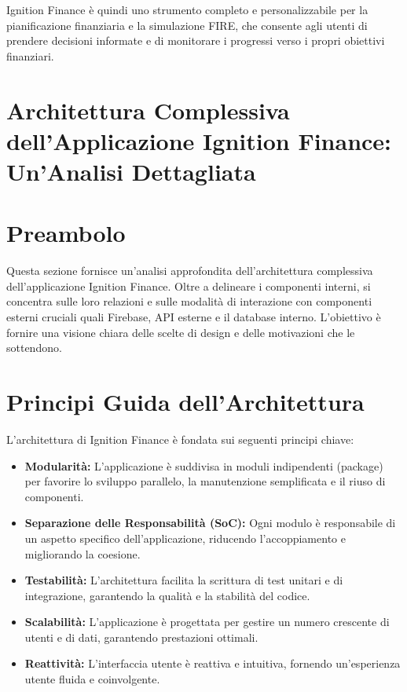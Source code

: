 \documentclass{article}
\begin{document}
Ignition Finance è quindi uno strumento completo e personalizzabile per la
pianificazione finanziaria e la simulazione FIRE, che consente agli utenti di
prendere decisioni informate e di monitorare i progressi verso i propri
obiettivi finanziari.
\section*{Architettura Complessiva dell'Applicazione Ignition Finance: Un'Analisi Dettagliata}
\section{Preambolo}\label{sec:preambolo}

Questa sezione fornisce un'analisi approfondita dell'architettura complessiva
dell'applicazione Ignition Finance.
Oltre a delineare i componenti interni, si
concentra sulle loro relazioni e sulle modalità di interazione con componenti
esterni cruciali quali Firebase, API esterne e il database interno.
L'obiettivo
è fornire una visione chiara delle scelte di design e delle motivazioni che le
sottendono.

\section{Principi Guida
dell'Architettura}\label{sec:principi-guida-dell'architettura}

L'architettura di Ignition Finance è fondata sui seguenti principi chiave:

\begin{itemize}
    \item \textbf{Modularità:} L'applicazione è suddivisa in moduli indipendenti
    (package) per favorire lo sviluppo parallelo, la manutenzione semplificata e
    il riuso di componenti.
    \item \textbf{Separazione delle Responsabilità (SoC):} Ogni modulo è
    responsabile di un aspetto specifico dell'applicazione, riducendo
    l'accoppiamento e migliorando la coesione.
    \item \textbf{Testabilità:} L'architettura facilita la scrittura di test
    unitari e di integrazione, garantendo la qualità e la stabilità del codice.
    \item \textbf{Scalabilità:} L'applicazione è progettata per gestire un
    numero crescente di utenti e di dati, garantendo prestazioni ottimali.
    \item \textbf{Reattività:} L'interfaccia utente è reattiva e intuitiva,
    fornendo un'esperienza utente fluida e coinvolgente.
\end{itemize}
\end{document}
